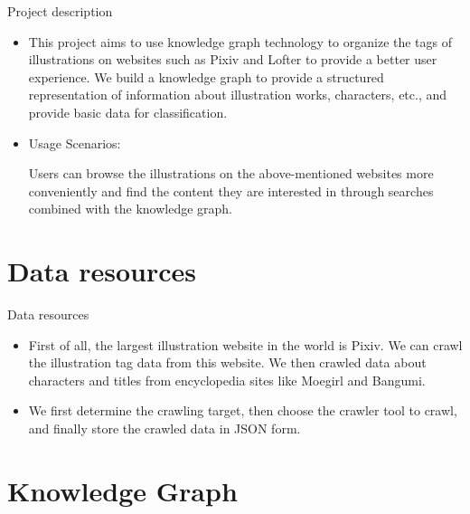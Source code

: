 \documentclass{beamer}
\begin{document}
\begin{frame}{Project description}
    \begin{itemize}
        \item This project aims to use knowledge graph technology to organize the tags of illustrations on websites such as Pixiv and Lofter to provide a better user experience. We build a knowledge graph to provide a structured representation of information about illustration works, characters, etc., and provide basic data for classification.
        \item Usage Scenarios: 
        \par Users can browse the illustrations on the above-mentioned websites more conveniently and find the content they are interested in through searches combined with the knowledge graph.
    \end{itemize}
\end{frame}

\section{Data resources}

\begin{frame}{Data resources}
    \begin{itemize}
        \item First of all, the largest illustration website in the world is Pixiv. We can crawl the illustration tag data from this website. We then crawled data about characters and titles from encyclopedia sites like Moegirl and Bangumi.
        \item We first determine the crawling target, then choose the crawler tool to crawl, and finally store the crawled data in JSON form.
    \end{itemize}
\end{frame}

\section{Knowledge Graph}
\end{document}

